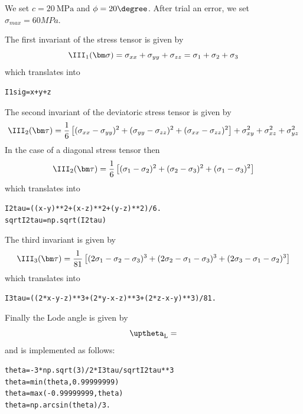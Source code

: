 We set $c=20~\si{\mega\pascal}$ and $\phi=20\degree$. After trial an error, we set $\sigma_{max}=60MPa$.

The first invariant of the stress tensor is given by 
\[
\III_1({\bm\sigma})=\sigma_{xx}+\sigma_{yy}+\sigma_{zz} = \sigma_1+\sigma_2+\sigma_3
\]
which translates into
\begin{lstlisting}
I1sig=x+y+z
\end{lstlisting}
The second invariant of the deviatoric stress tensor is given by 
\[
\III_2({\bm \tau})  
=\frac{1}{6}\left[(\sigma_{xx}-\sigma_{yy})^2 + (\sigma_{yy}-\sigma_{zz})^2 + (\sigma_{xx}-\sigma_{zz})^2 \right]  
+ \sigma_{xy}^2 + \sigma_{xz}^2 + \sigma_{yz}^2 
\]
In the case of a diagonal stress tensor then
\[
\III_2({\bm \tau})  
=\frac{1}{6}\left[(\sigma_{1}-\sigma_{2})^2 + (\sigma_{2}-\sigma_{3})^2 + (\sigma_{1}-\sigma_{3})^2 \right]  
\]
which translates into
\begin{lstlisting}
I2tau=((x-y)**2+(x-z)**2+(y-z)**2)/6.
sqrtI2tau=np.sqrt(I2tau)
\end{lstlisting}

The third invariant is given by
\[
\III_3(\bm \tau)
= \frac{1}{81}
\left[
(2\sigma_1-\sigma_2-\sigma_3)^3+
(2\sigma_2-\sigma_1-\sigma_3)^3+
(2\sigma_3-\sigma_1-\sigma_2)^3
\right] 
\]
which translates into
\begin{lstlisting}
I3tau=((2*x-y-z)**3+(2*y-x-z)**3+(2*z-x-y)**3)/81.
\end{lstlisting}

Finally the Lode angle is given by
\[
\uptheta_{\rm L} = 
\]
and is implemented as follows:
\begin{lstlisting}
theta=-3*np.sqrt(3)/2*I3tau/sqrtI2tau**3
theta=min(theta,0.99999999)
theta=max(-0.99999999,theta)
theta=np.arcsin(theta)/3.
\end{lstlisting}


